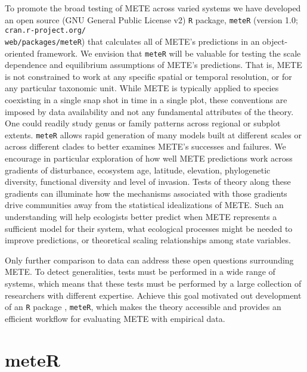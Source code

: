 To promote the broad testing of METE across varied systems we have
developed an open source (GNU General Public License v2) \texttt{R}
package, \texttt{meteR} (version 1.0;
\texttt{cran.r-project.org/\\web/packages/meteR}) that calculates all of
METE's predictions in an object-oriented framework. We envision that
\texttt{meteR} will be valuable for testing the scale dependence and
equilibrium assumptions of METE's predictions. That is, METE is not
constrained to work at any specific spatial or temporal resolution, or
for any particular taxonomic unit. While METE is typically applied to
species coexisting in a single snap shot in time in a single plot,
these conventions are imposed by data availability and not any
fundamental attributes of the theory. One could readily study genus or
family patterns across regional or subplot extents. \texttt{meteR}
allows rapid generation of many models built at different scales or
across different clades to better examines METE's successes and
failures. We encourage in particular exploration of how well METE
predictions work across gradients of disturbance, ecosystem age,
latitude, elevation, phylogenetic diversity, functional diversity and
level of invasion. Tests of theory along these gradients can
illuminate how the mechanisms associated with those gradients drive
communities away from the statistical idealizations of METE. Such an
understanding will help ecologists better predict when METE represents
a sufficient model for their system, what ecological processes might
be needed to improve predictions, or theoretical scaling relationships
among state variables.

Only further comparison to data can address these open questions
surrounding METE. To detect generalities, tests must be performed in a
wide range of systems, which means that these tests must be performed
by a large collection of researchers with different expertise. Achieve
this goal motivated out development of an \texttt{R} package
\citep{RDevelopmentCoreTeam2013}, \texttt{meteR}, which makes the theory
accessible and provides an efficient workflow for evaluating METE with
empirical data.


\section{meteR}

